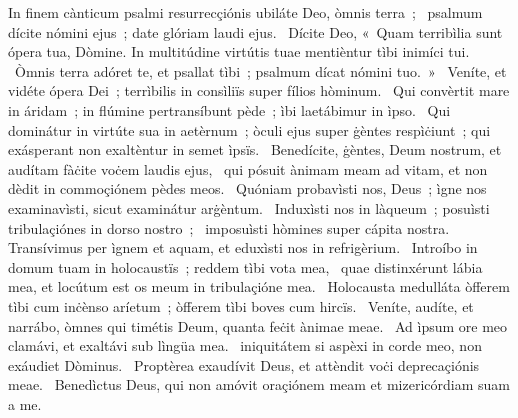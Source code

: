 { In finem cànticum psalmi resurrecçiónis}
{%
ubiláte Deo, òmnis terra~; 
~psalmum dícite nómini ejus~; date glóriam laudi ejus. 
~Dícite Deo, «~Quam terribìlia sunt ópera tua, Dòmine. In multitúdine virtútis tuae mentièntur tìbi inimíci tui. 
~Òmnis terra adóret te, et psallat tìbi~; psalmum dícat nómini tuo.~»
~Veníte, et vidéte ópera Dei~; terrìbilis in consìliïs super fílios hòminum. 
~Qui convèrtit mare in áridam~; in flúmine pertransíbunt pède~; ìbi laetábimur in ìpso. 
~Qui dominátur in virtúte sua in aetèrnum~; òculi ejus super ġèntes respìċiunt~; qui exásperant non exaltèntur in semet ìpsïs. 
~Benedícite, ġèntes, Deum nostrum, et audítam fàċite voċem laudis ejus, 
~qui pósuit ànimam meam ad vitam, et non dèdit in commoçiónem pèdes meos. 
~Quóniam probavìsti nos, Deus~; ìgne nos examinavìsti, sicut examinátur arġèntum. 
~Induxìsti nos in làqueum~; posuìsti tribulaçiónes in dorso nostro~; 
~imposuìsti hòmines super cápita nostra. Transívimus per ìgnem et aquam, et eduxìsti nos in refrigèrium. 
~Introíbo in domum tuam in holocaustïs~; reddem tìbi vota mea, 
~quae distinxérunt lábia mea, et locútum est os meum in tribulaçióne mea. 
~Holocausta medulláta òfferem tìbi cum inċènso aríetum~; òfferem tìbi boves cum hircïs. 
~Veníte, audíte, et narrábo, òmnes qui timétis Deum, quanta feċit ànimae meae. 
~Ad ìpsum ore meo clamávi, et exaltávi sub lìngüa mea. 
~iniquitátem si aspèxi in corde meo, non exáudiet Dòminus. 
~Proptèrea exaudívit Deus, et attèndit voċi deprecaçiónis meae. 
~Benedìctus Deus, qui non amóvit oraçiónem meam et mizericórdiam suam a me. 
}
